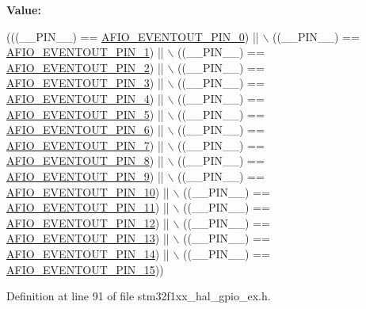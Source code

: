 {\bfseries Value\+:}
\begin{DoxyCode}
(((\_\_PIN\_\_) == \hyperlink{group___g_p_i_o_ex___e_v_e_n_t_o_u_t___p_i_n_ga1caf81a3226da92f477e6fd15cfef16b}{AFIO\_EVENTOUT\_PIN\_0}) || \(\backslash\)
                                       ((\_\_PIN\_\_) == \hyperlink{group___g_p_i_o_ex___e_v_e_n_t_o_u_t___p_i_n_gae2d151889f9f4b65ce6547aa80dca582}{AFIO\_EVENTOUT\_PIN\_1}) || \(\backslash\)
                                       ((\_\_PIN\_\_) == \hyperlink{group___g_p_i_o_ex___e_v_e_n_t_o_u_t___p_i_n_ga20d5efc2e37b380ba6acab899fac25ec}{AFIO\_EVENTOUT\_PIN\_2}) || \(\backslash\)
                                       ((\_\_PIN\_\_) == \hyperlink{group___g_p_i_o_ex___e_v_e_n_t_o_u_t___p_i_n_gac6eb85f0eff1513ba213dc9d1c0af35b}{AFIO\_EVENTOUT\_PIN\_3}) || \(\backslash\)
                                       ((\_\_PIN\_\_) == \hyperlink{group___g_p_i_o_ex___e_v_e_n_t_o_u_t___p_i_n_gaa2a1db689ed0a7b46f5ed773a2e54d54}{AFIO\_EVENTOUT\_PIN\_4}) || \(\backslash\)
                                       ((\_\_PIN\_\_) == \hyperlink{group___g_p_i_o_ex___e_v_e_n_t_o_u_t___p_i_n_gaa96afd6502080bd3d6cd68e6e06e7bfa}{AFIO\_EVENTOUT\_PIN\_5}) || \(\backslash\)
                                       ((\_\_PIN\_\_) == \hyperlink{group___g_p_i_o_ex___e_v_e_n_t_o_u_t___p_i_n_gae9b4ddb2c1bd1c343d396983148f1522}{AFIO\_EVENTOUT\_PIN\_6}) || \(\backslash\)
                                       ((\_\_PIN\_\_) == \hyperlink{group___g_p_i_o_ex___e_v_e_n_t_o_u_t___p_i_n_ga999cd9c3ce9821b73e7610f11da7258f}{AFIO\_EVENTOUT\_PIN\_7}) || \(\backslash\)
                                       ((\_\_PIN\_\_) == \hyperlink{group___g_p_i_o_ex___e_v_e_n_t_o_u_t___p_i_n_gaed7094c896c9284edbb2267a74e148a6}{AFIO\_EVENTOUT\_PIN\_8}) || \(\backslash\)
                                       ((\_\_PIN\_\_) == \hyperlink{group___g_p_i_o_ex___e_v_e_n_t_o_u_t___p_i_n_gacb2d76e8d7197ff9f65634034cb47ca1}{AFIO\_EVENTOUT\_PIN\_9}) || \(\backslash\)
                                       ((\_\_PIN\_\_) == \hyperlink{group___g_p_i_o_ex___e_v_e_n_t_o_u_t___p_i_n_ga2890d890882a1d2c32fc2a4d47117bfb}{AFIO\_EVENTOUT\_PIN\_10}) || \(\backslash\)
                                       ((\_\_PIN\_\_) == \hyperlink{group___g_p_i_o_ex___e_v_e_n_t_o_u_t___p_i_n_gaf36cec461fe61b6060137724f6ad3148}{AFIO\_EVENTOUT\_PIN\_11}) || \(\backslash\)
                                       ((\_\_PIN\_\_) == \hyperlink{group___g_p_i_o_ex___e_v_e_n_t_o_u_t___p_i_n_ga736b25c4c65a79dc259a6b7592c46d2a}{AFIO\_EVENTOUT\_PIN\_12}) || \(\backslash\)
                                       ((\_\_PIN\_\_) == \hyperlink{group___g_p_i_o_ex___e_v_e_n_t_o_u_t___p_i_n_ga990d0bda08e8837940fe244359e04da9}{AFIO\_EVENTOUT\_PIN\_13}) || \(\backslash\)
                                       ((\_\_PIN\_\_) == \hyperlink{group___g_p_i_o_ex___e_v_e_n_t_o_u_t___p_i_n_ga32432319feb5904520558d1ed5c74c81}{AFIO\_EVENTOUT\_PIN\_14}) || \(\backslash\)
                                       ((\_\_PIN\_\_) == \hyperlink{group___g_p_i_o_ex___e_v_e_n_t_o_u_t___p_i_n_ga09637caad04c7fb41cf804489e5d6037}{AFIO\_EVENTOUT\_PIN\_15}))
\end{DoxyCode}


Definition at line 91 of file stm32f1xx\+\_\+hal\+\_\+gpio\+\_\+ex.\+h.

